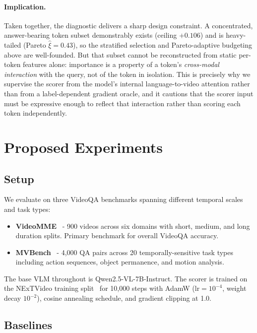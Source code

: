 \documentclass[12pt]{article}
\begin{document}
\paragraph{Implication.}
Taken together, the diagnostic delivers a sharp design constraint. A
concentrated, answer-bearing token subset demonstrably exists (ceiling
$+0.106$) and is heavy-tailed (Pareto $\hat{\xi} = 0.43$), so the
stratified selection and Pareto-adaptive budgeting above are well-founded.
But that subset cannot be reconstructed from static per-token features
alone: importance is a property of a token's \emph{cross-modal
interaction} with the query, not of the token in isolation. This is
precisely why we supervise the scorer from the model's internal
language-to-video attention rather than from a label-dependent gradient
oracle, and it cautions that the scorer input must be expressive enough to
reflect that interaction rather than scoring each token independently.

\section{Proposed Experiments}
 
\subsection{Setup}
 
We evaluate on three VideoQA benchmarks spanning different temporal
scales and task types:
 
\begin{itemize}
    \item \textbf{VideoMME}~\parencite{fu2025videommefirstevercomprehensiveevaluation} - 900 videos
    across six domains with short, medium, and long duration splits.
    Primary benchmark for overall VideoQA accuracy.
 
    \item \textbf{MVBench}~\parencite{li2024mvbenchcomprehensivemultimodalvideo} - 4,000 QA
    pairs across 20 temporally-sensitive task types including action
    sequences, object permanence, and motion analysis.
\end{itemize}
 
The base VLM throughout is Qwen2.5-VL-7B-Instruct. The scorer is
trained on the NExTVideo training split~\parencite{nextqa} for 10,000
steps with AdamW ($\text{lr} = 10^{-4}$, weight decay $10^{-2}$),
cosine annealing schedule, and gradient clipping at 1.0.
 
\subsection{Baselines}
 
\end{document}
